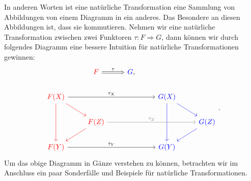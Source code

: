 \documentclass[leqno]{article}
\theoremstyle{plain}
\theoremstyle{definition}
\theoremstyle{remark}
\begin{document}
In anderen Worten ist eine natürliche Transformation eine Sammlung von Abbildungen von einem Diagramm in ein anderes. Das Besondere an diesen Abbildungen ist, dass sie kommutieren. Nehmen wir eine natürliche Transformation zwischen zwei Funktoren $\tau: F \Longrightarrow G$, dann können wir durch folgendes Diagramm eine bessere Intuition für natürliche Transformationen gewinnen:
\begin{equation}
	\begin{tikzcd}
	                                                   & {\color{red}F} \arrow[r, Rightarrow, "\tau"]                 & {\color{blue}G}, &                            &                 \\
	{\color{red}F(X)} \arrow[dd, red] \arrow[rd, red] \arrow[rrr, "\tau_{X}"] &                                         &   & {\color{blue}G(X)} \arrow[rd, blue] \arrow[dd, blue] &                 \\
	                                                   & {\color{red}F(Z)} \arrow[ld, red] \arrow[rrr, "\tau_{Z}", gray] &   &                            & {\color{blue}G(Z)} \arrow[ld, blue] \\
	{\color{red}F(Y)} \arrow[rrr, "\tau_{Y}"]                       &                                         &   & {\color{blue}G(Y)}                       &                
	\end{tikzcd}.
\end{equation}
Um das obige Diagramm in Gänze verstehen zu können, betrachten wir im Anschluss ein paar Sonderfälle und Beispiele für natürliche Transformationen.
\end{document}
